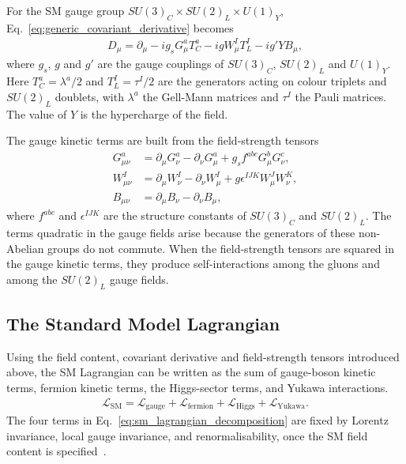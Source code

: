 For the SM gauge group $SU(3)_{C}\times SU(2)_{L}\times U(1)_{Y}$, Eq.~\eqref{eq:generic_covariant_derivative} becomes
\begin{align}
    D_{\mu}
    =
    \partial_{\mu}
    -
    ig_{s}G_{\mu}^{a}T_{C}^{a}
    -
    igW_{\mu}^{I}T_{L}^{I}
    -
    ig'YB_{\mu},
    \label{eq:sm_covariant_derivative}
\end{align}
where $g_{s}$, $g$ and $g'$ are the gauge couplings of $SU(3)_{C}$, $SU(2)_{L}$ and $U(1)_{Y}$. 
Here $T_{C}^{a}=\lambda^{a}/2$ and $T_{L}^{I}=\tau^{I}/2$ are the generators acting on colour triplets and $SU(2)_{L}$ doublets, with $\lambda^{a}$ the Gell-Mann matrices and $\tau^{I}$ the Pauli matrices. 
The value of $Y$ is the hypercharge of the field. 

The gauge kinetic terms are built from the field-strength tensors
\begin{align*}
    G_{\mu\nu}^{a}
    &=
    \partial_{\mu}G_{\nu}^{a}
    -
    \partial_{\nu}G_{\mu}^{a}
    +
    g_{s}f^{abc}G_{\mu}^{b}G_{\nu}^{c},
    \\
    W_{\mu\nu}^{I}
    &=
    \partial_{\mu}W_{\nu}^{I}
    -
    \partial_{\nu}W_{\mu}^{I}
    +
    g\epsilon^{IJK}W_{\mu}^{J}W_{\nu}^{K},
    \\
    B_{\mu\nu}
    &=
    \partial_{\mu}B_{\nu}
    -
    \partial_{\nu}B_{\mu},
\end{align*}
where $f^{abc}$ and $\epsilon^{IJK}$ are the structure constants of $SU(3)_{C}$ and $SU(2)_{L}$.
The terms quadratic in the gauge fields arise because the generators of these non-Abelian groups do not commute.
When the field-strength tensors are squared in the gauge kinetic terms, they produce self-interactions among the gluons and among the $SU(2)_{L}$ gauge fields.

\subsection{The Standard Model Lagrangian}
\label{subsec:sm_lagrangian}

Using the field content, covariant derivative and field-strength tensors introduced above, the SM Lagrangian can be written as the sum of gauge-boson kinetic terms, fermion kinetic terms, the Higgs-sector terms, and Yukawa interactions. 
\begin{align}
    \mathcal{L}_{\mathrm{SM}}
    =
    \mathcal{L}_{\mathrm{gauge}}
    +
    \mathcal{L}_{\mathrm{fermion}}
    +
    \mathcal{L}_{\mathrm{Higgs}}
    +
    \mathcal{L}_{\mathrm{Yukawa}}.
    \label{eq:sm_lagrangian_decomposition}
\end{align}
The four terms in Eq.~\eqref{eq:sm_lagrangian_decomposition} are fixed by Lorentz invariance, local gauge invariance, and renormalisability, once the SM field content is specified~\cite{PDG2024}.

